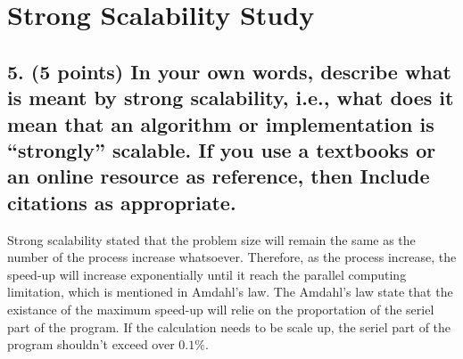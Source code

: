 \documentclass[pstricks,border=14pt,14pt]{article}
\begin{document}
\section*{Strong Scalability Study}
\subsection*{5. (5 points) In your own words, describe what is meant by strong scalability, i.e., what does it mean that an algorithm or implementation is “strongly” scalable. If you use a textbooks or an online resource as reference, then Include citations as appropriate.}
Strong scalability stated that the problem size will remain the same as the number of the process increase whatsoever. Therefore, as the process increase, the speed-up will increase exponentially until it reach the parallel computing limitation, which is mentioned in Amdahl's law. The Amdahl's law state that the existance of the maximum speed-up will relie on the proportation of the seriel part of the program. If the calculation needs to be scale up, the seriel part of the program shouldn't exceed over $0.1\%$. 
\end{document}
